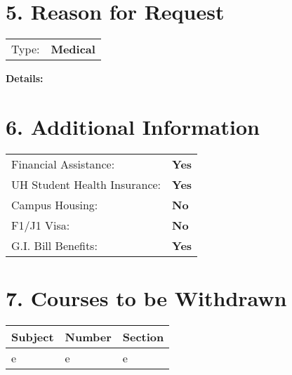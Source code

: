 \documentclass[12pt]{article}
\begin{document}
\vspace{0.5cm}

\section*{5. Reason for Request}
\begin{tabular}{ll}
Type: & \textbf{Medical} \\
\end{tabular}

\noindent\textbf{Details:}\\

\vspace{0.5cm}

\section*{6. Additional Information}
\begin{tabular}{ll}
Financial Assistance: & \textbf{Yes} \\
UH Student Health Insurance: & \textbf{Yes} \\
Campus Housing: & \textbf{No} \\
F1/J1 Visa: & \textbf{No} \\
G.I. Bill Benefits: & \textbf{Yes} \\
\end{tabular}

\vspace{0.5cm}

\section*{7. Courses to be Withdrawn}
\begin{tabular}{lll}
\textbf{Subject} & \textbf{Number} & \textbf{Section} \\
\hline
e & e & e \\

\end{tabular}

\vspace{0.5cm}
\end{document}

